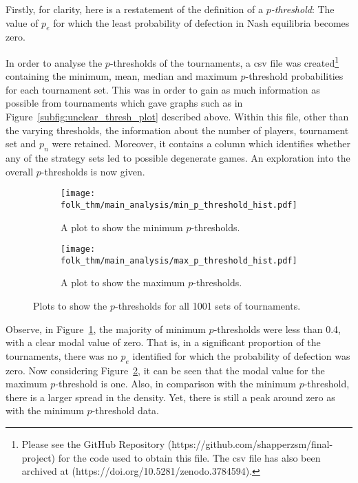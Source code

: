 Firstly, for clarity, here is a restatement of the definition of a
\textit{\(p\)-threshold}: The value of \(p_{e}\) for which the
least probability of defection in Nash equilibria becomes zero.

In order to analyse the \(p\)-thresholds of the tournaments, a csv file was
created\footnote{Please see the GitHub Repository
(https://github.com/shapperzsm/final-project) for the code used to obtain this
file. The csv file has also been archived at (https://doi.org/10.5281/zenodo.3784594).}
containing the
minimum, mean, median and maximum \(p\)-threshold probabilities for each
tournament set.
This was in order to gain as much information as possible from tournaments which
gave graphs such as in Figure~\ref{subfig:unclear_thresh_plot} described above. 
Within this file, other than the varying thresholds, the
information about the number of players, tournament set and \(p_{n}\) were
retained. Moreover, it contains a column which identifies whether any
of the strategy sets led to possible degenerate games. An exploration into the overall \(p\)-thresholds is now given.

\begin{figure}
    \centering
    \begin{subfigure}{0.45\textwidth}
        \centering
        \texttt{[image: folk\_thm/main\_analysis/min\_p\_threshold\_hist.pdf]}
        \caption{A plot to show the minimum \(p\)-thresholds.}\label{subfig:min_p_thresh}
    \end{subfigure}
    \hspace{3pt}
    \begin{subfigure}{0.45\textwidth}
        \centering
        \texttt{[image: folk\_thm/main\_analysis/max\_p\_threshold\_hist.pdf]}
        \caption{A plot to show the maximum \(p\)-thresholds.}\label{subfig:max_p_thresh}
    \end{subfigure}
    \caption{Plots to show the \(p\)-thresholds for all 1001 sets of tournaments.}\label{fig:min_max_p_thresh}
\end{figure}

Observe, in Figure~\ref{subfig:min_p_thresh}, the majority of minimum \(p\)-thresholds
were less than 0.4, with a clear modal value of zero. That is, in a significant
proportion of the tournaments, there was no \(p_{e}\)
identified for
which the probability of defection was zero. Now considering Figure~\ref{subfig:max_p_thresh}, it can be seen that the modal value for the
maximum \(p\)-threshold is one.
Also, in comparison with the minimum \(p\)-threshold, there is a larger spread in the
density. Yet, there is still a peak around zero as with the minimum \(p\)-threshold
data. 

